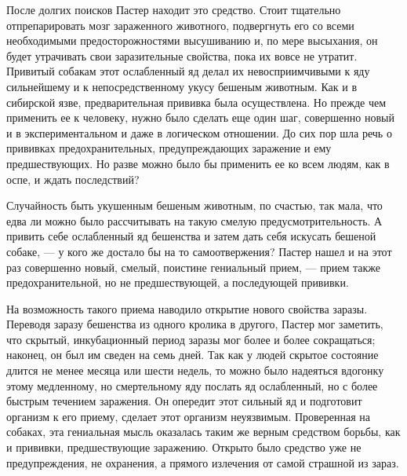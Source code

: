 После долгих  поисков  Пастер  находит  это  средство.  Стоит  тщательно
отпрепарировать мозг  зараженного животного,  подвергнуть его  со  всеми
необходимыми предосторожностями  высушиванию и,  по мере  высыхания,  он
будет утрачивать свои заразительные свойства, пока их вовсе не  утратит.
Привитый собакам этот  ослабленный яд  делал их  невосприимчивыми к  яду
сильнейшему и  к  непосредственному  укусу бешеным  животным.  Как  и  в
сибирской язве, предварительная  прививка была  осуществлена. Но  прежде
чем применить ее к человеку, нужно было сделать еще один шаг, совершенно
новый и в экспериментальном  и даже в логическом  отношении. До сих  пор
шла речь о прививках предохранительных, предупреждающих заражение и  ему
предшествующих. Но разве можно было бы применить ее ко всем людям, как в
оспе, и ждать последствий?

Случайность быть укушенным бешеным животным,  по счастью, так мала,  что
едва ли можно было рассчитывать на такую смелую предусмотрительность.  А
привить себе ослабленный яд бешенства и затем дать себя искусать бешеной
собаке, --- у кого же достало бы  на то самоотвержения? Пастер нашел и  на
этот раз совершенно  новый, смелый, поистине  гениальный прием, ---  прием
также предохранительной, но не предшествующей, а последующей прививки.

На возможность такого приема  наводило открытие нового свойства  заразы.
Переводя заразу  бешенства  из  одного кролика  в  другого,  Пастер  мог
заметить, что скрытый,  инкубационный период  заразы мог  более и  более
сокращаться; наконец, он  был им сведен  на семь дней.  Так как у  людей
скрытое состояние длится не менее месяца или шести недель, то можно было
надеяться вдогонку  этому медленному,  но  смертельному яду  послать  яд
ослабленный, но с  более быстрым  течением заражения.  Он опередит  этот
сильный яд и  подготовит организм  к его приему,  сделает этот  организм
неуязвимым. Проверенная на собаках, эта гениальная мысль оказалась таким
же верным средством  борьбы, как и  прививки, предшествующие  заражению.
Открыто было средство  уже не  предупреждения, не  охранения, а  прямого
излечения от самой страшной из зараз.

